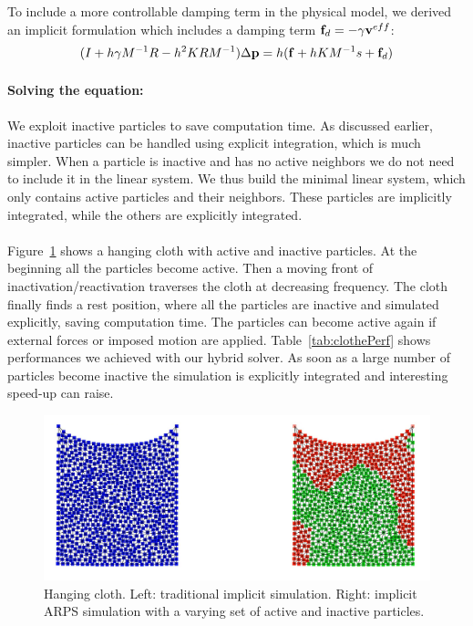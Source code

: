 To include a more controllable damping term in the physical model, we derived an implicit formulation which includes a damping term $\mathbf{f}_{d} = -\gamma \mathbf{v}^{eff}$:
\begin{equation}
	\label{eq:arpsLinearSystemDamped}
	( I + h\gamma M^{-1}R -h^{2}KRM^{-1} ) \Delta \mathbf{p} = h( \mathbf{f} + h KM^{-1}s + \mathbf{f}_{d})
\end{equation}

\paragraph*{Solving the equation:}
We exploit inactive particles to save computation time.
As discussed earlier, inactive particles can be handled using explicit integration, which is much simpler.
When a particle is inactive and has no active neighbors we do not need to include it in the linear system.
We thus build the minimal linear system, which only contains active particles and their neighbors.
These particles are implicitly integrated, while the others are explicitly integrated.
\paragraph*{}
Figure~\ref{fig:clothARPS} shows a hanging cloth with active and inactive particles.
At the beginning all the particles become active. Then a moving front of inactivation/reactivation traverses the cloth at decreasing frequency. The cloth finally finds a rest position, where all the particles are inactive and simulated explicitly, saving computation time. The particles can become active again if external forces or imposed motion are applied.
Table~\ref{tab:clothePerf} shows performances we achieved with our hybrid solver.
As soon as a large number of particles become inactive the simulation is explicitly integrated and interesting speed-up can raise.

\begin{figure}[!h]
	\centering
	\includegraphics[width=0.8\linewidth]{images/arps-vriphys2013/Square3.jpg}
	\caption[ARPS: ARPS cloth simulation]{\label{fig:clothARPS} Hanging cloth. Left: traditional implicit simulation. Right: implicit ARPS simulation with a varying set of active and inactive particles. }
\end{figure}

